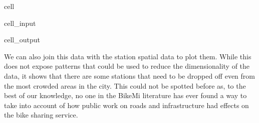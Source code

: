 \documentclass[letterpaper,10pt,english]{jupyterBook}
\begin{document}
\begin{sphinxuseclass}{cell}
\begin{sphinxuseclass}{cell_input}
\begin{sphinxVerbatim}[commandchars=\\\{\}]
 

 


\end{sphinxVerbatim}

\end{sphinxuseclass}
\begin{sphinxuseclass}{cell_output}
\noindent{}

\end{sphinxuseclass}
\end{sphinxuseclass}
\sphinxAtStartPar
We can also join this data with the station spatial data to plot them. While this does not expose patterns that could be used to reduce the dimensionality of the data, it shows that there are some stations that need to be dropped off even from the most crowded areas in the city. This could not be spotted before as, to the best of our knowledge, no one in the BikeMi literature has ever found a way to take into account of how public work on roads and infrastructure had effects on the bike sharing service.
\end{document}
